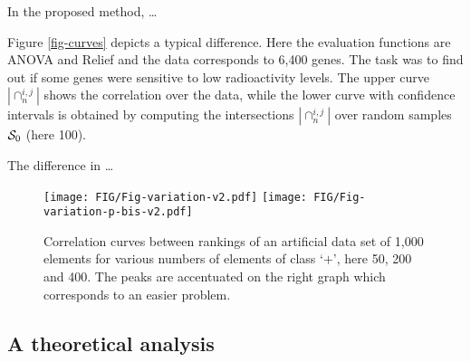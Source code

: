 \documentclass[twocolumn,english]{article}
\begin{document}
In the proposed method, \ldots

Figure \ref{fig-curves} depicts a typical difference. Here the evaluation functions are ANOVA and {\sc Relief} \cite{kononenko1994estimating} and the data corresponds to 6,400 genes. The task was to find out if some genes were sensitive to low radioactivity levels. The upper curve $|\cap_n^{i,j}|$ shows the correlation over the data, while the lower curve with confidence intervals is obtained by computing the intersections $|\cap_n^{i,j}|$ over random samples ${\cal S}_0$ (here 100). 


The difference in \ldots

\begin{figure}
\centering
\texttt{[image: FIG/Fig-variation-v2.pdf]}
\hspace{0.2cm}
\texttt{[image: FIG/Fig-variation-p-bis-v2.pdf]}
\caption{Correlation curves between rankings of an artificial data set of 1,000 elements for various numbers of elements of class `$+$', here 50, 200 and 400. The peaks are accentuated on the right graph which corresponds to an easier problem.}
\label{fig-correlation-curves-artificial}
\end{figure}



%
%


\subsection{A theoretical analysis}
\label{sec-combi-2fcts-inter-n}
\end{document}
